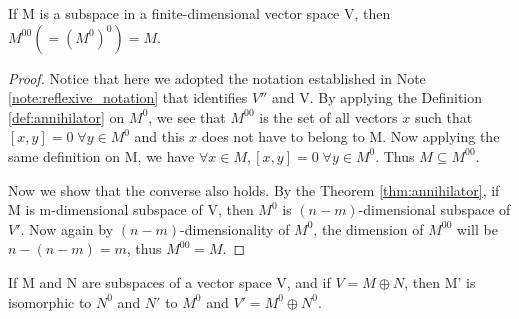 \documentclass[10pt,a4paper]{article}
\begin{document}
\begin{corollary}\label{cor:annihilator}
    If M is a subspace in a finite-dimensional vector space V, then $M^{00}(=(M^0)^0)=M$.
\end{corollary}

\begin{proof}
    Notice that here we adopted the notation established in Note \ref{note:reflexive_notation} that identifies $V''$ and V. By applying the Definition \ref{def:annihilator} on $M^0$, we see that $M^{00}$ is the set of all vectors $x$ such that $[x,y]=0\;\forall y\in M^0$ and this $x$ does not have to belong to M. Now applying the same definition on M, we have $\forall x\in M, [x,y]=0\;\forall y\in M^0$. Thus $M\subseteq M^{00}$. 
    
    Now we show that the converse also holds. By the Theorem \ref{thm:annihilator}, if M is m-dimensional subspace of V, then $M^0$ is $(n-m)$-dimensional subspace of $V'$. Now again by $(n-m)$-dimensionality of $M^0$, the dimension of $M^{00}$ will be $n-(n-m)=m$, thus $M^{00}=M$.
\end{proof}

\begin{theorem}\label{thm:dual_direct_sum}
    If M and N are subspaces of a vector space V, and if $V=M\oplus N$, then M' is isomorphic to $N^0$ and $N'$ to $M^0$ and $V'=M^0\oplus N^0$.
\end{theorem}
\end{document}
